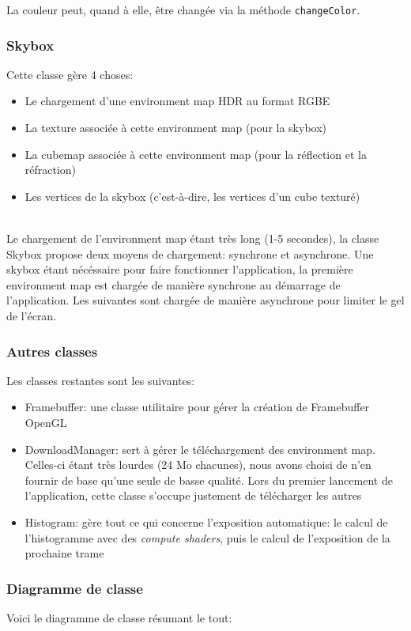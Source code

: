 \documentclass[a4paper,12pt]{article}
\newcommand{\svg}[2][0cm]{
    \begin{figure}[H]
        \centering
        \def\svgwidth{\columnwidth - #1}
        
    \end{figure}
}
\begin{document}
La couleur peut, quand à elle, être changée via la méthode \texttt{changeColor}.

\subsubsection{Skybox}
Cette classe gère 4 choses:
\begin{itemize}
    \item Le chargement d'une environment map HDR au format RGBE
    \item La texture associée à cette environment map (pour la skybox)
    \item La cubemap associée à cette environment map (pour la réflection et la réfraction)
    \item Les vertices de la skybox (c'est-à-dire, les vertices d'un cube texturé)
\end{itemize}

\ \\
Le chargement de l'environment map étant très long (1-5 secondes), la classe Skybox propose deux moyens de chargement:
synchrone et asynchrone. Une skybox étant nécéssaire pour faire fonctionner l'application, la première environment map
est chargée de manière synchrone au démarrage de l'application. Les suivantes sont chargée de manière asynchrone
pour limiter le gel de l'écran.

\subsubsection{Autres classes}
Les classes restantes sont les suivantes:
\begin{itemize}
    \item Framebuffer: une classe utilitaire pour gérer la création de Framebuffer OpenGL
    \item DownloadManager: sert à gérer le téléchargement des environment map. Celles-ci étant très lourdes (24 Mo chacunes), nous avons choisi de n'en fournir de base qu'une seule de basse qualité. Lors du premier lancement de l'application, cette classe s'occupe justement de télécharger les autres
    \item Histogram: gère tout ce qui concerne l'exposition automatique: le calcul de l'histogramme avec des \emph{compute shaders}, puis le calcul de l'exposition de la prochaine trame
\end{itemize}

\subsubsection{Diagramme de classe}
Voici le diagramme de classe résumant le tout:
\svg{UML}
\end{document}
